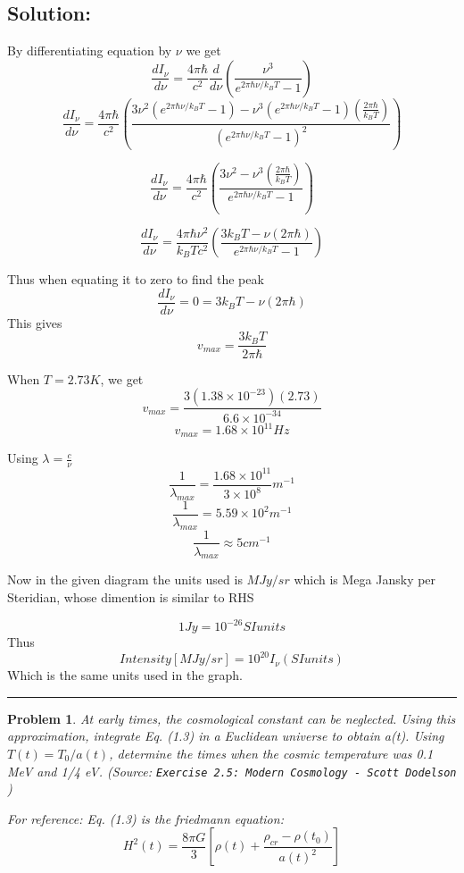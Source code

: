 \documentclass[11pt]{article}
\newenvironment{solution}{\subsection*{Solution:}}{\vspace{0.5cm} \hrule \vspace{0.7cm}}
\newtheorem{problem}{Problem}
\begin{document}
\begin{solution}
	By differentiating equation by $\nu$ we get
	$$ \frac{d I_\nu}{d\nu} = \frac{4\pi\hbar}{c^2} \frac{d}{d\nu}\left(
		\frac{\nu^3}{e^{2\pi\hbar\nu/k_BT} - 1}\right) $$
	$$ \frac{d I_\nu}{d\nu} =\frac{4\pi\hbar}{c^2} \left(
		\frac{3\nu^2 (e^{2\pi\hbar\nu/k_BT} - 1) - \nu^3
		(e^{2\pi\hbar\nu/k_BT} - 1) (\frac{2\pi\hbar}{k_B T})}{ (e^{2\pi\hbar\nu/k_BT} - 1)^2}
		\right)$$

	$$ \frac{d I_\nu}{d\nu} =\frac{4\pi\hbar}{c^2} \left(
		\frac{3\nu^2  - \nu^3
		 (\frac{2\pi\hbar}{k_B T})}{ e^{2\pi\hbar\nu/k_BT} - 1}
		\right)$$


	$$ \frac{d I_\nu}{d\nu} =\frac{4\pi\hbar \nu^2}{k_B Tc^2} \left(
		\frac{3k_B T  - \nu
		 (2\pi\hbar)}{ e^{2\pi\hbar\nu/k_BT} - 1}
		\right)$$

	Thus when equating it to zero to find the peak
	$$ \frac{d I_\nu}{d\nu} = 0 = 3k_B T  - \nu
		 (2\pi\hbar)$$
		 This gives $$ v_{max} = \frac{3k_B T}{2\pi \hbar} $$

	When $T = 2.73 K$, we get
	$$ v_{max} = \frac{3(1.38 \times 10^{-23}) (2.73)}{6.6 \times 10^{-34}} $$
	$$ v_{max} = 1.68 \times 10^{11} Hz $$

	Using $ \lambda = \frac{c}{\nu}$
	$$ \frac{1}{\lambda_{max}} = \frac{1.68 \times 10^{11}}{3\times 10^8}
	m^{-1} $$
	$$ \frac{1}{\lambda_{max}} = 5.59 \times 10^{2}m^{-1} $$
	$$ \frac{1}{\lambda_{max}} \approx 5 cm^{-1} $$

	Now in the given diagram the units used is $MJy/sr$ which is Mega Jansky
	per Steridian, whose dimention is similar to RHS

	$$ 1 Jy = 10^{-26} SI units $$
	Thus
	$$ Intensity[MJy/sr] = 10^{20} I_\nu (SI units) $$
	Which is the same units used in the graph.


\end{solution}

\begin{problem}
	At early times, the cosmological constant can be neglected. Using this
	approximation, integrate Eq. (1.3) in a Euclidean universe to obtain a(t). Using
	$T (t) = T_0/a(t)$,
	determine the times when the cosmic temperature was 0.1 MeV and 1/4 eV.
        (Source: \texttt{Exercise 2.5: Modern Cosmology - Scott Dodelson} )

	For reference: Eq. (1.3) is the friedmann equation:
	$$ H^2(t) = \frac{8\pi G}{3} \left[ \rho(t) + \frac{\rho_{cr} -
	\rho(t_0)}{a(t)^2} \right] $$
\end{problem}
\end{document}

